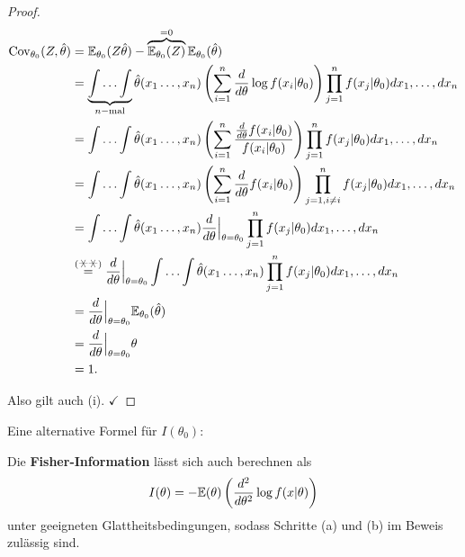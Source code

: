 \documentclass{tstextbook}
\begin{document}
\begin{proof}
	\[
	\begin{aligned}
		\Cov_{\theta_0}(Z,\hat{\theta}) & = \E_{\theta_0}(Z\hat{\theta})-\overbrace{\E_{\theta_0}(Z)}^{=0}\E_{\theta_0}(\hat{\theta}) \\
		& = \underbrace{\int\ldots\int}_{n-{\text{mal}}}\hat{\theta}(x_1\ldots,x_n)\left(\sum_{i=1}^{n}\frac{d}{d\theta}\log f(x_i|\theta_0)\right)\prod_{j=1}^{n} f(x_j|\theta_0) dx_1,\ldots,dx_n \\
		& = \int\ldots\int\hat{\theta}(x_1\ldots,x_n)\left(\sum_{i=1}^{n}\frac{\frac{d}{d\theta}f(x_i|\theta_0)}{f(x_i|\theta_0)}\right)\prod_{j=1}^{n} f(x_j|\theta_0) dx_1,\ldots,dx_n \\
		& = \int\ldots\int\hat{\theta}(x_1\ldots,x_n)\left(\sum_{i=1}^{n}\frac{d}{d\theta}f(x_i|\theta_0)\right)\prod_{j=1,i\ne i}^{n} f(x_j|\theta_0) dx_1,\ldots,dx_n \\
		& = \int\ldots\int\hat{\theta}(x_1\ldots,x_n)\frac{d}{d\theta}\Big|_{\theta=\theta_0}\prod_{j=1}^{n} f(x_j|\theta_0) dx_1,\ldots,dx_n \\
		& \overset{(\hexstar\hexstar)}{=} \frac{d}{d\theta}\Big|_{\theta=\theta_0} \int\ldots\int\hat{\theta}(x_1\ldots,x_n)\prod_{j=1}^{n} f(x_j|\theta_0) dx_1,\ldots,dx_n \\
		& = \frac{d}{d\theta}\Big|_{\theta=\theta_0} \E_{\theta_0}(\hat{\theta}) \\
		& = \frac{d}{d\theta}\Big|_{\theta=\theta_0} \theta \\
		& = 1.
	\end{aligned}
	\]
	
	Also gilt auch (i). $ \checkmark $
	\end{proof}
	
Eine alternative Formel für $ I(\theta_0) $: 
\begin{lemma}
	Die \textbf{Fisher-Information}  lässt sich auch berechnen als 
	\[I(\theta)=-\mathbb E(\theta)\left(\frac{d^2}{d\theta^2}\log f(x|\theta)\right)\] 
	unter geeigneten Glattheitsbedingungen, sodass Schritte (a) und (b) im Beweis zulässig sind.
\end{lemma}
\end{document}

